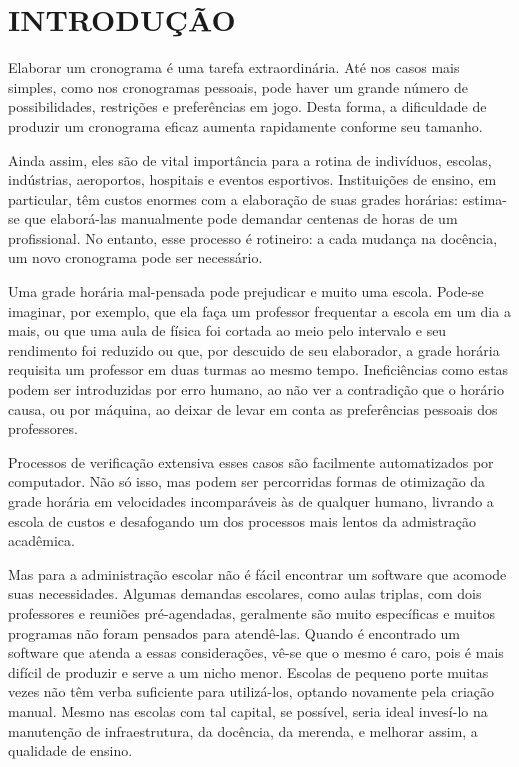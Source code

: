 \documentclass[12pt,a4paper]{article}
\begin{document}
	\begingroup
		\let\clearpage\relax
		\vspace{-1cm} %
		\tableofcontents
	\endgroup

	\newpage


	\section{INTRODUÇÃO}

		\par Elaborar um cronograma é uma tarefa extraordinária. Até nos casos mais simples, como nos cronogramas pessoais, pode haver um grande número de possibilidades, restrições e preferências em jogo. Desta forma, a dificuldade de produzir um cronograma eficaz aumenta rapidamente conforme seu tamanho.

		\par Ainda assim, eles são de vital importância para a rotina de indivíduos, escolas, indústrias, aeroportos, hospitais e eventos esportivos. Instituições de ensino, em particular, têm custos enormes com a elaboração de suas grades horárias: estima-se que elaborá-las manualmente pode demandar centenas de horas \cite{appleby} de um profissional. No entanto, esse processo é rotineiro: a cada mudança na docência, um novo cronograma pode ser necessário.

		\par Uma grade horária mal-pensada pode prejudicar e muito uma escola. Pode-se imaginar, por exemplo, que ela faça um professor frequentar a escola em um dia a mais, ou que uma aula de física foi cortada ao meio pelo intervalo e seu rendimento foi reduzido ou que, por descuido de seu elaborador, a grade horária requisita um professor em duas turmas ao mesmo tempo. Ineficiências como estas podem ser introduzidas por erro humano, ao não ver a contradição que o horário causa, ou por máquina, ao deixar de levar em conta as preferências pessoais dos professores.

		\par Processos de verificação extensiva esses casos são facilmente automatizados por computador. Não só isso, mas podem ser percorridas formas de otimização da grade horária em velocidades incomparáveis às de qualquer humano, livrando a escola de custos e desafogando um dos processos mais lentos da admistração acadêmica.

		\par Mas para a administração escolar não é fácil encontrar um software que acomode suas necessidades. Algumas demandas escolares, como aulas triplas, com dois professores e reuniões pré-agendadas, geralmente são muito específicas e muitos programas não foram pensados para atendê-las. Quando é encontrado um software que atenda a essas considerações, vê-se que o mesmo é caro, pois é mais difícil de produzir e serve a um nicho menor. Escolas de pequeno porte muitas vezes não têm verba suficiente para utilizá-los, optando novamente pela criação manual. Mesmo nas escolas com tal capital, se possível, seria ideal invesí-lo na manutenção de infraestrutura, da docência, da merenda, e melhorar assim, a qualidade de ensino.
\end{document}
